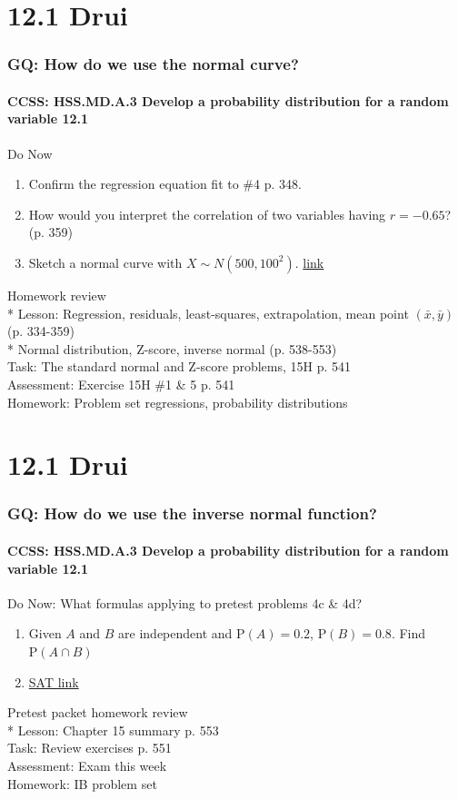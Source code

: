 \documentclass{beamer}
\begin{document}
  \section{12.1 Drui}
  \frame
  {
    \frametitle{GQ: How do we use the normal curve?}
    \framesubtitle{CCSS: HSS.MD.A.3 Develop a probability distribution for a random variable \qquad \alert{12.1}}

    \begin{block}{Do Now}
      \begin{enumerate}
      \item Confirm the regression equation fit to \#4 p. 348.
      \item How would you interpret the correlation of two variables having $r=-0.65$? (p. 359)
      \item Sketch a normal curve with $X\sim N(500, 100^2)$.
      \href{https://blog.prepscholar.com/sat-standard-deviation}{link}
      \end{enumerate}
   \end{block}
    Homework review\\*
    Lesson:  Regression, residuals, least-squares, extrapolation, mean point $(\bar{x},\bar{y})$ (p. 334-359)\\*
    Normal distribution, Z-score, inverse normal (p. 538-553) \\%
    Task: The standard normal and Z-score problems, 15H p. 541\\%
    Assessment: Exercise 15H \#1 \& 5 p. 541\\%
    Homework: Problem set regressions, probability distributions
  }

  \section{12.1 Drui}
  \frame
  {
    \frametitle{GQ: How do we use the inverse normal function?}
    \framesubtitle{CCSS: HSS.MD.A.3 Develop a probability distribution for a random variable \qquad \alert{12.1}}

    \begin{block}{Do Now: What formulas applying to pretest problems 4c \& 4d?}
      \begin{enumerate}
      \item Given $A$ and $B$ are independent and $\mathrm{P}(A)=0.2$, $\mathrm{P}(B)=0.8$. Find $\mathrm{P}(A \cap B)$
      \item \href{https://blog.prepscholar.com/sat-standard-deviation}{SAT link}
      \end{enumerate}
   \end{block}
    Pretest packet homework review\\*
    Lesson: Chapter 15 summary p. 553\\%
    Task: Review exercises p. 551\\%
    Assessment: Exam this week\\%
    Homework: IB problem set
  }
\end{document}
